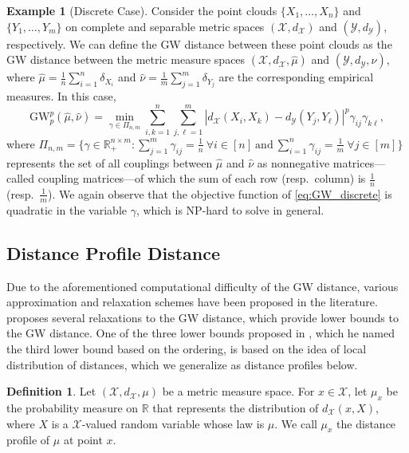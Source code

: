 \documentclass[11pt,letterpaper]{article}
\theoremstyle{definition}
\newtheorem{definition}{Definition}
\newtheorem{example}{Example}
\numberwithin{equation}{section}
\newcommand{\cX}{\mathcal{X}}
\newcommand{\cY}{\mathcal{Y}}
\newcommand{\R}{\mathbb{R}}
\begin{document}
\begin{example}[Discrete Case]
    \label{ex:GW_discrete}
    Consider the point clouds $\{X_1, \ldots, X_n\}$ and $\{Y_1, \ldots, Y_m\}$ on complete and separable metric spaces $(\cX, d_\cX)$ and $(\cY, d_\cY)$, respectively. We can define the GW distance between these point clouds as the GW distance between the metric measure spaces $(\cX, d_\cX, \hat{\mu})$ and $(\cY, d_\cY, \hat{\nu})$, where $\hat{\mu} = \frac{1}{n} \sum_{i = 1}^{n} \delta_{X_i}$ and $\hat{\nu} = \frac{1}{m} \sum_{j = 1}^{m} \delta_{Y_j}$ are the corresponding empirical measures. In this case, 
    \begin{equation}
        \label{eq:GW_discrete}
        \mathrm{GW}_p^p(\hat{\mu}, \hat{\nu}) = \min_{\gamma \in \Pi_{n, m}} \sum_{i, k = 1}^{n} \sum_{j, \ell = 1}^{m} |d_\cX(X_i, X_k) - d_\cY(Y_j, Y_\ell)|^p \gamma_{i j} \gamma_{k \ell},
    \end{equation}
    where $\Pi_{n, m} = \{\gamma \in \R_+^{n \times m} : \sum_{j = 1}^{m} \gamma_{i j} = \frac{1}{n} ~ \forall i \in [n] ~ \text{and} ~ \sum_{i = 1}^{n} \gamma_{i j} = \frac{1}{m} ~ \forall j \in [m]\} $ represents the set of all couplings between $\hat{\mu}$ and $\hat{\nu}$ as nonnegative matrices---called coupling matrices---of which the sum of each row (resp.\ column) is $\frac{1}{n}$ (resp.\ $\frac{1}{m}$). We again observe that the objective function of \eqref{eq:GW_discrete} is quadratic in the variable $\gamma$, which is NP-hard to solve in general.
\end{example}


\subsection{Distance Profile Distance}
Due to the aforementioned computational difficulty of the GW distance, various approximation and relaxation schemes have been proposed in the literature. \cite{memoli2011gromov} proposes several relaxations to the GW distance, which provide lower bounds to the GW distance. One of the three lower bounds proposed in \cite{memoli2011gromov}, which he named the third lower bound based on the ordering, is based on the idea of local distribution of distances, which we generalize as distance profiles below. 

\begin{definition}
    \label{def:distance_profile}
    Let $(\cX, d_\cX, \mu)$ be a metric measure space. For $x \in \cX$, let $\mu_x$ be the probability measure on $\R$ that represents the distribution of $d_\cX(x, X)$, where $X$ is a $\cX$-valued random variable whose law is $\mu$. We call $\mu_x$ the distance profile of $\mu$ at point $x$.
\end{definition}
\end{document}
